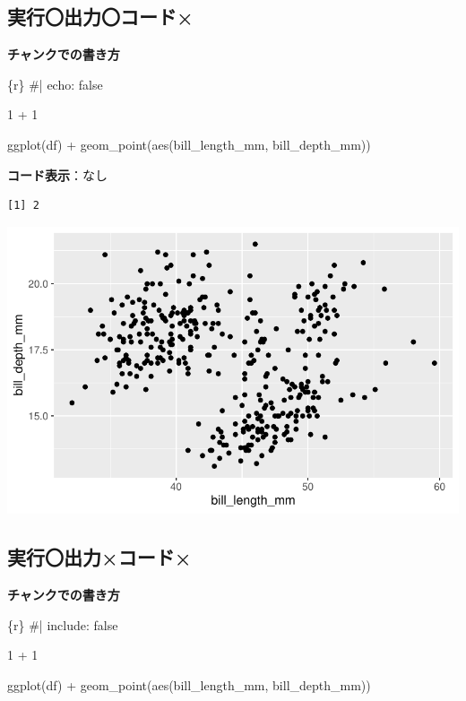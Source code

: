 \documentclass[
  b5paper,
  xelatex, ja=standard]{bxjsbook}
\newenvironment{Shaded}{\begin{snugshade}}{\end{snugshade}}
\newcommand{\InformationTok}[1]{\textcolor[rgb]{0.37,0.37,0.37}{#1}}
\begin{document}
\subsection{実行〇\textbar 出力〇\textbar コード×}

\textbf{チャンクでの書き方}

\begin{Shaded}
\begin{Highlighting}[]
\InformationTok{\textasciigrave{}\textasciigrave{}\textasciigrave{}\{r\}}
\InformationTok{\#| echo: false}

\InformationTok{1 + 1}


\InformationTok{ggplot(df) +}
\InformationTok{  geom\_point(aes(bill\_length\_mm, bill\_depth\_mm))}
\InformationTok{\textasciigrave{}\textasciigrave{}\textasciigrave{}}
\end{Highlighting}
\end{Shaded}

\textbf{コード表示}：なし

\begin{verbatim}
[1] 2
\end{verbatim}

\includegraphics{basic_files/figure-pdf/unnamed-chunk-4-1.pdf}

\subsection{実行〇\textbar 出力×\textbar コード×}

\textbf{チャンクでの書き方}

\begin{Shaded}
\begin{Highlighting}[]
\InformationTok{\textasciigrave{}\textasciigrave{}\textasciigrave{}\{r\}}
\InformationTok{\#| include: false}

\InformationTok{1 + 1}


\InformationTok{ggplot(df) +}
\InformationTok{  geom\_point(aes(bill\_length\_mm, bill\_depth\_mm))}
\InformationTok{\textasciigrave{}\textasciigrave{}\textasciigrave{}}
\end{Highlighting}
\end{Shaded}
\end{document}
